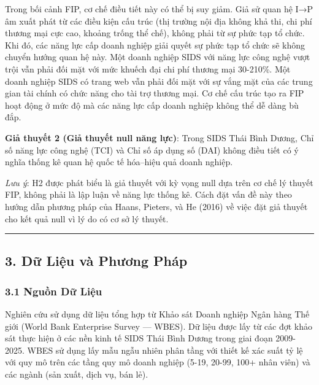 \documentclass[12pt,a4paper]{article}
\begin{document}
Trong bối cảnh FIP, cơ chế điều tiết này có thể bị suy giảm. Giả sử quan
hệ I→P âm xuất phát từ các điều kiện cấu trúc (thị trường nội địa không
khả thi, chi phí thương mại cực cao, khoảng trống thể chế), không phải
từ sự phức tạp tổ chức. Khi đó, các năng lực cấp doanh nghiệp giải quyết
sự phức tạp tổ chức sẽ không chuyển hướng quan hệ này. Một doanh nghiệp
SIDS với năng lực công nghệ vượt trội vẫn phải đối mặt với mức khuếch
đại chi phí thương mại 30-210\%. Một doanh nghiệp SIDS có trang web vẫn
phải đối mặt với sự vắng mặt của các trung gian tài chính có chức năng
cho tài trợ thương mại. Cơ chế cấu trúc tạo ra FIP hoạt động ở mức độ mà
các năng lực cấp doanh nghiệp không thể dễ dàng bù đắp.

\textbf{Giả thuyết 2 (Giả thuyết null năng lực)}: Trong SIDS Thái Bình
Dương, Chỉ số năng lực công nghệ (TCI) và Chỉ số áp dụng số (DAI) không
điều tiết có ý nghĩa thống kê quan hệ quốc tế hóa--hiệu quả doanh
nghiệp.

\emph{Lưu ý}: H2 được phát biểu là giả thuyết với kỳ vọng null dựa trên
cơ chế lý thuyết FIP, không phải là lập luận về năng lực thống kê. Cách
đặt vấn đề này theo hướng dẫn phương pháp của Haans, Pieters, và He
(2016) về việc đặt giả thuyết cho kết quả null vì lý do có cơ sở lý
thuyết.

\begin{center}\rule{0.5\linewidth}{0.5pt}\end{center}

\hypertarget{3-dux1eef-liux1ec7u-vuxe0-phux1b0ux1a1ng-phuxe1p}{%
\subsection{3. Dữ Liệu và Phương
Pháp}\label{3-dux1eef-liux1ec7u-vuxe0-phux1b0ux1a1ng-phuxe1p}}

\hypertarget{31-nguux1ed3n-dux1eef-liux1ec7u}{%
\subsubsection{3.1 Nguồn Dữ
Liệu}\label{31-nguux1ed3n-dux1eef-liux1ec7u}}

Nghiên cứu sử dụng dữ liệu tổng hợp từ Khảo sát Doanh nghiệp Ngân hàng
Thế giới (World Bank Enterprise Survey --- WBES). Dữ liệu được lấy từ
các đợt khảo sát thực hiện ở các nền kinh tế SIDS Thái Bình Dương trong
giai đoạn 2009-2025. WBES sử dụng lấy mẫu ngẫu nhiên phân tầng với thiết
kế xác suất tỷ lệ với quy mô trên các tầng quy mô doanh nghiệp (5-19,
20-99, 100+ nhân viên) và các ngành (sản xuất, dịch vụ, bán lẻ).
\end{document}
